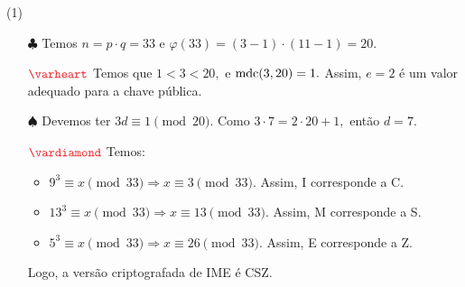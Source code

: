 \documentclass[12pt, a4paper]{article}
\newcommand{\mdc}{{\rm mdc}}
\newcommand{\negrito}[1]{\mbox{\boldmath{$#1$}}}
\newcounter{exercicio}[section]
\newenvironment{exercicio}[1][]{\refstepcounter{exercicio}\par\medskip
 \textcolor{blue}{\bf(\theexercicio)} \rmfamily}{\medskip }
\newcommand{\itens}[1]{\begin{tasks}[label={(tsk[a])},label-width=3.6ex, label-format = {\bfseries}, column-sep = {0pt}](1) #1\end{tasks}}
\newcommand{\alt}[1]{\textcolor{Floresta}{$\negrito{(#1)} $}}
\begin{document}
\begin{solution}
\itens{
\task[\alt{a}] 
\begin{itemize} 
\item[$\clubsuit$] Temos $n = p \cdot q = 33$ e $\varphi(33) = (3-1) \cdot (11-1) = 20.$
\item[$\textcolor{Red}{\varheart}$] Temos que $1 < 3 < 20,$ e $\mdc(3,20) = 1.$ Assim, $e = 2$ é um valor adequado para a chave pública.
\item[$\spadesuit$] Devemos ter $3d \equiv 1 \pmod{20}.$ Como $3 \cdot 7 = 2 \cdot 20 + 1,$ então $d = 7.$
\item[$\textcolor{Red}{\vardiamond}$] Temos:
\begin{itemize}
    \item $9^3 \equiv x \pmod{33} \Rightarrow  x \equiv 3 \pmod{33}.$
Assim, I corresponde a C.
    \item $13^3 \equiv x \pmod{33} \Rightarrow x \equiv 13 \pmod{33}.$
Assim, M corresponde a S.
    \item $5^3 \equiv x \pmod{33} \Rightarrow x \equiv 26 \pmod{33}.$
Assim, E corresponde a Z.
\end{itemize}
Logo, a versão criptografada de IME é CSZ.
\end{itemize}
\task[\alt{b}] 
}
\end{solution}
\begin{comment}
\begin{exercicio}
Vamos utilizar o Teorema de Euler para criar uma versão mais geral do Teorema de Wilson.
\itens{
\task[\alt{a}] Seja $x$ tal que $ax \equiv 1 \pmod{n}.$ Mostre que, se $\mdc(a,n) = 1,$ então $x \equiv a^{\varphi(n) - 1} \pmod n.$
\task[\alt{b}] Calcule 
\[
\prod\limits_{\substack{r=1 \\ \mdc(r,n) = 1}}^{n} r \equiv \pm 1 \pmod n.
\]
}
\end{exercicio}
\end{comment}
\end{document}
